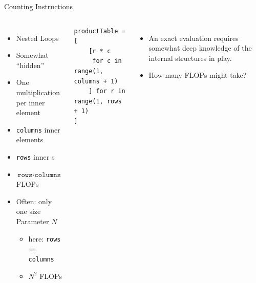 \begin{frame}[fragile]{Counting Instructions}
%
\begin{columns}[T]
\begin{itemize}
\item Nested Loops
\item Somewhat \enquote{hidden}
\item One multiplication per inner  element
\item \texttt{columns} inner  elements
\item \texttt{rows} inner s
\item[\Thus] $\texttt{rows} \cdot \texttt{columns}$ FLOPs
\item Often: only one size Parameter $N$
	\begin{itemize}
	\item \ie here: \texttt{rows == columns}
	\item[\Thus] $N^2$ FLOPs
	\end{itemize}
\end{itemize}
%
\begin{codebox}
\begin{verbatim}
productTable = [
    [r * c 
     for c in range(1, columns + 1)
    ] for r in range(1, rows + 1)
]
\end{verbatim}
\end{codebox}
%
\begin{itemize}
\item An exact evaluation requires somewhat deep knowledge of the internal structures in play.
\item How many FLOPs might  take?
\end{itemize}
\end{columns}
%
\end{frame}



